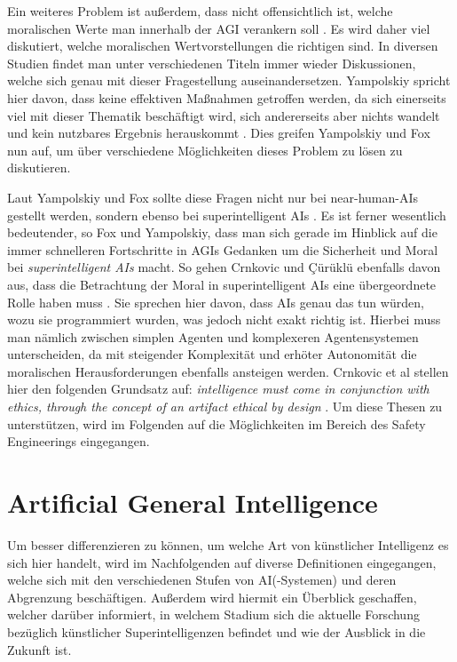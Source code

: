             Ein weiteres Problem ist außerdem, dass nicht offensichtlich ist, welche moralischen Werte man innerhalb der
            AGI verankern soll \cite[s. 1]{yampolskiy2013safety}. Es wird daher viel diskutiert, welche moralischen
            Wertvorstellungen die richtigen sind. In diversen Studien findet man unter verschiedenen Titeln immer
            wieder Diskussionen, welche sich genau mit dieser Fragestellung auseinandersetzen. Yampolskiy spricht hier
            davon, dass keine effektiven Maßnahmen getroffen werden, da sich einerseits viel mit dieser Thematik
            beschäftigt wird, sich andererseits aber nichts wandelt und kein nutzbares Ergebnis herauskommt \cite[s. 1]{yampolskiy2013safety}.
            Dies greifen Yampolskiy und Fox nun auf, um über verschiedene Möglichkeiten dieses Problem zu lösen zu diskutieren.

            Laut Yampolskiy und Fox sollte diese Fragen nicht nur bei near-human-AIs gestellt werden, sondern ebenso bei
            superintelligent AIs \cite[s. 2]{yampolskiy2013safety}. Es ist ferner wesentlich bedeutender, so Fox und
            Yampolskiy, dass man sich gerade im Hinblick auf die immer schnelleren Fortschritte in AGIs Gedanken um die
            Sicherheit und Moral bei \textit{superintelligent AIs} macht. So gehen Crnkovic und {\c{C}}{\"u}r{\"u}kl{\"u}
            ebenfalls davon aus, dass die Betrachtung der Moral in superintelligent AIs eine übergeordnete Rolle haben
            muss \cite{crnkovic2012robots}. Sie sprechen hier davon, dass AIs genau das tun würden, wozu sie programmiert
            wurden, was jedoch nicht exakt richtig ist. Hierbei muss man nämlich zwischen simplen Agenten und komplexeren
            Agentensystemen unterscheiden, da mit steigender Komplexität und erhöter Autonomität die moralischen
            Herausforderungen ebenfalls ansteigen werden. Crnkovic et al stellen hier den folgenden Grundsatz auf:
            \textit{intelligence must come in conjunction with ethics, through the concept of an artifact ethical by design}
            \cite{crnkovic2012robots}. Um diese Thesen zu unterstützen, wird im Folgenden auf die Möglichkeiten im Bereich
            des Safety Engineerings eingegangen.


    \section{Artificial General Intelligence}
        Um besser differenzieren zu können, um welche Art von künstlicher Intelligenz es sich hier handelt, wird im
        Nachfolgenden auf diverse Definitionen eingegangen, welche sich mit den verschiedenen Stufen von AI(-Systemen)
        und deren Abgrenzung beschäftigen. Außerdem wird hiermit ein Überblick geschaffen, welcher darüber informiert,
        in welchem Stadium sich die aktuelle Forschung bezüglich künstlicher Superintelligenzen befindet und wie der
        Ausblick in die Zukunft ist.

